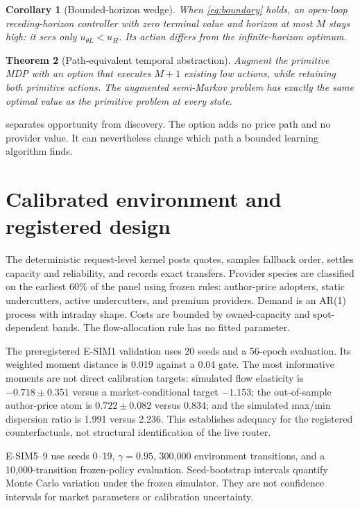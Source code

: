 \documentclass[11pt]{article}
\newtheorem{theorem}{Theorem}
\newtheorem{corollary}[theorem]{Corollary}
\newcommand{\1}{\mathbf{1}}
\begin{document}
\begin{corollary}[Bounded-horizon wedge]
When \cref{eq:boundary} holds, an open-loop receding-horizon controller with
zero terminal value and horizon at most $M$ stays high: it sees only
$u_{\theta L}<u_H$.  Its action differs from the infinite-horizon optimum.
\end{corollary}

\begin{theorem}[Path-equivalent temporal abstraction]
Augment the primitive MDP with an option that executes $M+1$ existing low
actions, while retaining both primitive actions.  The augmented semi-Markov
problem has exactly the same optimal value as the primitive problem at every
state.
\label{thm:option}
\end{theorem}

 separates opportunity from discovery.  The option adds no
price path and no provider value.  It can nevertheless change which path a
bounded learning algorithm finds.

\section{Calibrated environment and registered design}

The deterministic request-level kernel posts quotes, samples fallback order,
settles capacity and reliability, and records exact transfers.  Provider
species are classified on the earliest 60\% of the panel using frozen rules:
author-price adopters, static undercutters, active undercutters, and premium
providers.  Demand is an AR(1) process with intraday shape.  Costs are bounded
by owned-capacity and spot-dependent bands.  The flow-allocation rule has no
fitted parameter.

The preregistered E-SIM1 validation uses 20 seeds and a 56-epoch evaluation.
Its weighted moment distance is 0.019 against a 0.04 gate.  The most
informative moments are not direct calibration targets: simulated flow
elasticity is $-0.718\pm0.351$ versus a market-conditional target $-1.153$;
the out-of-sample author-price atom is $0.722\pm0.082$ versus $0.834$; and
the simulated max/min dispersion ratio is 1.991 versus 2.236.  This establishes
adequacy for the registered counterfactuals, not structural identification of
the live router.

E-SIM5--9 use seeds 0--19, $\gamma=0.95$, 300,000 environment transitions,
and a 10,000-transition frozen-policy evaluation.  Seed-bootstrap intervals
quantify Monte Carlo variation under the frozen simulator.  They are not
confidence intervals for market parameters or calibration uncertainty.
\end{document}
